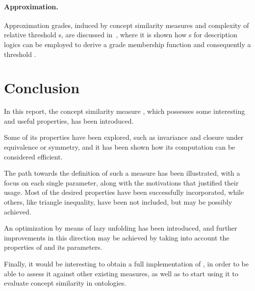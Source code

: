   \paragraph{Approximation.} Approximation grades, induced by concept similarity measures and complexity of relative threshold \dl{}s, are discussed in~\cite{Ba17}, where it is shown how \csm{}s for \el description logics can be employed to derive a grade membership function and consequently a threshold \dl.

  \section{Conclusion}

  In this report, the concept similarity measure \simi, which possesses some interesting and useful properties, has been introduced.

  Some of its properties have been explored, such as invariance and closure under equivalence or symmetry, and it has been shown how its computation can be considered efficient.

  The path towards the definition of such a measure has been illustrated, with a focus on each single parameter, along with the motivations that justified their usage.
  Most of the desired properties have been successfully incorporated, while others, like triangle inequality, have been not included, but may be possibly achieved.

  An optimization by means of lazy unfolding has been introduced, and further improvements in this direction may be achieved by taking into account the properties of \simi and its parameters.

  Finally, it would be interesting to obtain a full implementation of \simi, in order to be able to assess it against other existing measures, as well as to start using it to evaluate concept similarity in ontologies.